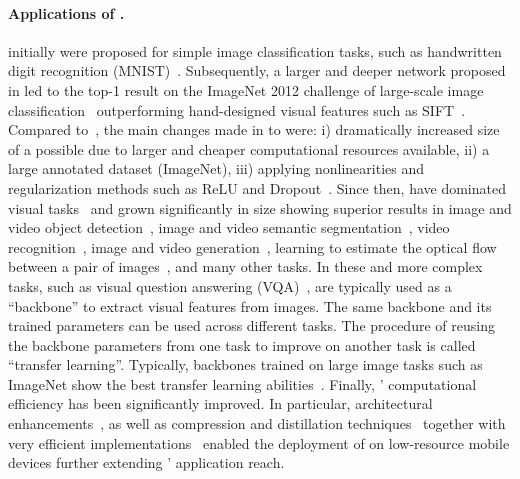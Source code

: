 \paragraph{Applications of \cnns.} \cnns initially were proposed for simple image classification tasks, such as handwritten digit recognition (MNIST)~\citep{lecun1998gradient}. Subsequently, a larger and deeper network proposed in \citep{krizhevsky2012imagenet} led to the top-1 result on the ImageNet 2012 challenge of large-scale image classification~\citep{russakovsky2015imagenet} outperforming hand-designed visual features such as SIFT~\citep{lowe2004distinctive}.
Compared to~\citep{lecun1998gradient}, the main changes made in \citep{krizhevsky2012imagenet} to \cnns were: i) dramatically increased size of a \cnn possible due to larger and cheaper computational resources available, ii) a large annotated dataset (\ie ImageNet), iii) applying nonlinearities and regularization methods such as ReLU and Dropout~\citep{hinton2012improving}.
Since then, \cnns have dominated visual tasks~\citep{gu2018recent} and grown significantly in size showing superior results in image and video object
detection~\citep{ren2015faster,wang2017video,he2016deep,he2015delving}, image and video semantic segmentation~\citep{long2015fully,shelhamer2016clockwork}, video recognition~\citep{simonyan2014two}, image and video generation~\citep{goodfellow2014generative,vondrick2016generating}, learning to estimate the optical flow between a pair of images~\citep{dosovitskiy2015flownet}, and many other tasks.
In these and more complex tasks, such as visual question answering (VQA)~\citep{antol2015vqa}, \cnns are typically used as a ``backbone'' to extract visual features from images. The same backbone and its trained parameters can be used across different tasks. The procedure of reusing the backbone parameters from one task to improve on another task is called ``transfer learning''. Typically, backbones trained on large image tasks such as ImageNet show the best transfer learning abilities~\citep{huh2016makes,kornblith2019better}.
Finally, \cnns' computational efficiency has been significantly improved. In particular, architectural enhancements~\citep{howard2017mobilenets,cai2019onceforall}, as well as compression and distillation techniques~\citep{cheng2017survey} together with very efficient implementations~\citep{chetlur2014cudnn} enabled the deployment of \cnns on low-resource mobile devices further extending \cnns' application reach.

